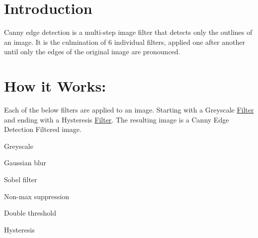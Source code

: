 \hypertarget{index_intro_sec}{}\section{Introduction}\label{index_intro_sec}
Canny edge detection is a multi-\/step image filter that detects only the outlines of an image. It is the culmination of 6 individual filters, applied one after another until only the edges of the original image are pronounced.\hypertarget{index_how_works_sec}{}\section{How it Works\+:}\label{index_how_works_sec}
Each of the below filters are applied to an image. Starting with a Greyscale \hyperlink{classFilter}{Filter} and ending with a Hysteresis \hyperlink{classFilter}{Filter}. The resulting image is a Canny Edge Detection Filtered image.


\begin{DoxyEnumerate}
\item Greyscale
\item Gaussian blur
\item Sobel filter
\item Non-\/max suppression
\item Double threshold
\item Hysteresis
\end{DoxyEnumerate}